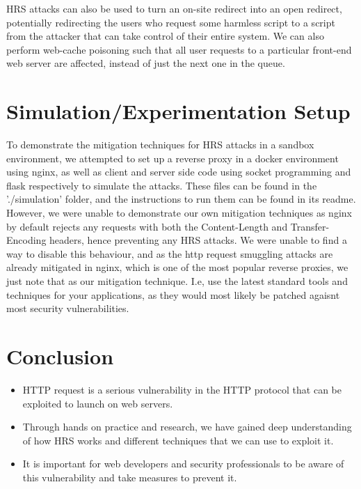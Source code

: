 \documentclass[conference]{IEEEtran}
\begin{document}
\vspace*{2mm}
\par{ \noindent
	HRS attacks can also be used to turn an on-site redirect into an open redirect, potentially redirecting the users who request some harmless script to a script from the attacker that can take control of their entire system. We can also perform web-cache poisoning such that all user requests to a particular front-end web server are affected, instead of just the next one in the queue.   
}


\section{Simulation/Experimentation Setup}
To demonstrate the mitigation techniques for HRS attacks in a sandbox environment, we attempted to set up a reverse proxy in a docker environment using nginx, as well as client and server side code using socket programming and flask respectively to simulate the attacks. These files can be found in the './simulation' folder, and the instructions to run them can be found in its readme.  However, we were unable to demonstrate our own mitigation techniques as nginx by default rejects any requests with both the Content-Length and Transfer-Encoding headers, hence preventing any HRS attacks. We were unable to find a way to disable this behaviour, and as the http request smuggling attacks are already mitigated in nginx, which is one of the most popular reverse proxies, we just note that as our mitigation technique. I.e, use the latest standard tools and techniques for your applications, as they would most likely be patched agaisnt most security vulnerabilities.


\section{Conclusion}
\begin{itemize}
    \item HTTP request is a serious vulnerability in the HTTP protocol that can be exploited to launch on web servers.
    \item Through hands on practice and research, we have gained deep understanding of how HRS works and different techniques that we can use to exploit it.
    \item It is important for web developers and security professionals to be aware of this vulnerability and take measures to prevent it.
\end{itemize}
\end{document}
